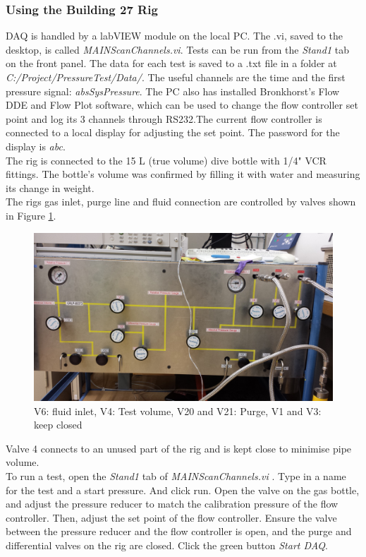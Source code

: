 \documentclass{report}
\begin{document}
\subsubsection{Using the Building 27 Rig}
DAQ is handled by a labVIEW module on the local PC. The .vi, saved to the desktop, is called \textit{MAIN\textunderscore ScanChannels.vi}. Tests can be run from the \textit{Stand1} tab on the front panel. The data for each test is saved to a .txt file in a folder at \textit{C:/Project/PressureTest/Data/}. The useful channels are the time and the first pressure signal: \textit{absSysPressure}. The PC also has installed Bronkhorst's Flow DDE and Flow Plot software, which can be used to change the flow controller set point and log its 3 channels through RS232.The current flow controller is connected to a local display for adjusting the set point. The password for the display is \textit{abc}. \\
The rig is connected to the 15 L (true volume) dive bottle with 1/4" VCR fittings. The bottle's volume was confirmed by filling it with water and measuring its change in weight. \\
The rigs gas inlet, purge line and fluid connection are controlled by valves shown in Figure \ref{valves}.

\begin{figure}[h] 
\includegraphics[width=\textwidth]{valves}
\caption{V6: fluid inlet, V4: Test volume, V20 and V21: Purge, V1 and V3: keep closed}
\label{valves}
\end{figure}

Valve 4 connects to an unused part of the rig and is kept close to minimise pipe volume.\\
To run a test, open the \textit{Stand1} tab of \textit{MAIN\textunderscore ScanChannels.vi} . Type in a name for the test and a start pressure. And click run. Open the valve on the gas bottle, and adjust the pressure reducer to match the calibration pressure of the flow controller. Then, adjust the set point of the flow controller. Ensure the valve between the pressure reducer and the flow controller is open, and the purge and differential valves on the rig are closed. Click the green button \textit{Start DAQ}.
\end{document}
